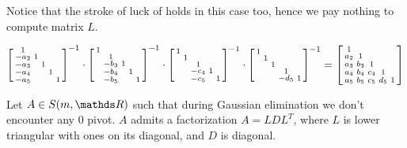 \documentclass[ComputationalMathematics.tex]{subfiles}
\begin{document}
\begin{obs}
  Notice that the stroke of luck of  holds in this case too, hence we pay nothing to compute matrix $L$.
  
\begin{gather*}
\begin{bsmallmatrix}
    1 & \\
    -a_2 & 1 & \\
    -a_3 &  & 1  \\
    -a_4 &  & & 1  \\
    -a_5 &  &  & & 1 
\end{bsmallmatrix}^{-1} \cdot
\begin{bsmallmatrix}
    1 & \\
     & 1 & \\
     & -b_3 & 1  \\
     & -b_4 & & 1  \\
     & -b_5 &  & & 1 
\end{bsmallmatrix}^{-1} \cdot
\begin{bsmallmatrix}
    1 & \\
     & 1 & \\
     &  & 1  \\
     &  & -c_4& 1  \\
     &  & -c_5 & & 1 
\end{bsmallmatrix}^{-1} \cdot 
\begin{bsmallmatrix}
    1 & \\
     & 1 & \\
     &  & 1  \\
     &  & & 1  \\
     &  &  & -d_5& 1 
\end{bsmallmatrix}^{-1}
= \begin{bsmallmatrix}
    1 & \\
    a_2 & 1 & \\
    a_3 & b_3 & 1  \\
    a_4 & b_4 & c_4& 1  \\
    a_5 & b_5 & c_5 &d_5 & 1     
\end{bsmallmatrix}
\end{gather*}
\end{obs}

\begin{theorem}
Let $A \in S(m, \R)$ such that during Gaussian elimination we don't encounter any $0$ pivot. $A$ admits a factorization $A=LDL^T$, where $L$ is lower triangular with ones on its diagonal, and $D$ is diagonal.
\end{theorem}
\end{document}
